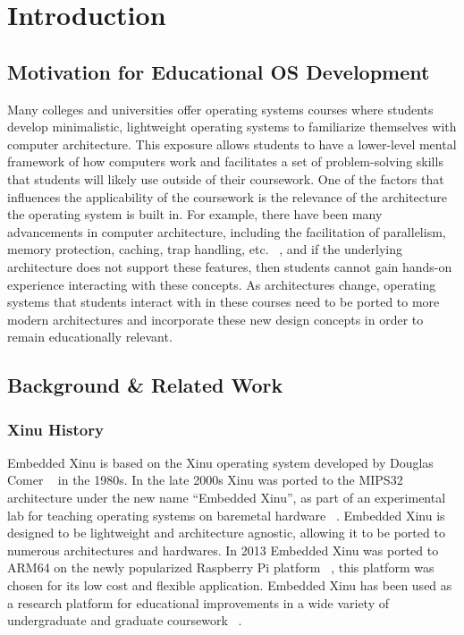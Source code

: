 \section{Introduction}

\subsection{Motivation for Educational OS Development}

Many colleges and universities offer operating systems courses where students develop minimalistic, lightweight operating systems to familiarize themselves with computer architecture. This exposure allows students to have a lower-level mental framework of how computers work and facilitates a set of problem-solving skills that students will likely use outside of their coursework. One of the factors that influences the applicability of the coursework is the relevance of the architecture the operating system is built in. For example, there have been many advancements in computer architecture, including the facilitation of parallelism, memory protection, caching, trap handling, etc. ~\cite{Advances_In_Arc}, and if the underlying architecture does not support these features, then students cannot gain hands-on experience interacting with these concepts. As architectures change, operating systems that students interact with in these courses need to be ported to more modern architectures and incorporate these new design concepts in order to remain educationally relevant.

\subsection{Background \& Related Work}

\subsubsection{Xinu History}

Embedded Xinu is based on the Xinu operating system developed by Douglas Comer ~\cite{original_xinu_paper} in the 1980s. In the late 2000s Xinu was ported to the MIPS32 architecture under the new name ``Embedded Xinu'', as part of an experimental lab for teaching operating systems on baremetal hardware ~\cite{XINU_mips_port}. Embedded Xinu is designed to be lightweight and architecture agnostic, allowing it to be ported to numerous architectures and hardwares. In 2013 Embedded Xinu was ported to ARM64 on the newly popularized Raspberry Pi platform ~\cite{XINU_rpi_port}, this platform was chosen for its low cost and flexible application. Embedded Xinu has been used as a research platform for educational improvements in a  wide variety of undergraduate and graduate coursework ~\cite{Nexos_paper, teaching_with_rpi, rpi_parallel_compute, rpi_multicore, mips_networking, xest}.

